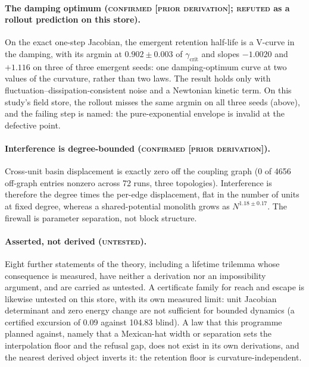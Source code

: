 \documentclass{article} %
\begin{document}
\paragraph{The damping optimum (\textsc{confirmed [prior derivation]}; \textsc{refuted} as a
rollout prediction on this store).} On the exact one-step Jacobian, the emergent retention
half-life is a V-curve in the damping, with its argmin at $0.902\pm0.003$ of
$\gamma_{\text{crit}}$ and slopes $-1.0020$ and $+1.116$ on three of three emergent seeds: one
damping-optimum curve at two values of the curvature, rather than two laws.
The result holds only with fluctuation--dissipation-consistent noise and a Newtonian kinetic term.
On this study's field store, the rollout misses the same argmin on all three seeds (above), and the
failing step is named: the pure-exponential envelope is invalid at the defective point.

\paragraph{Interference is degree-bounded (\textsc{confirmed [prior derivation]}).} Cross-unit
basin displacement is exactly zero off the coupling graph (0 of 4656 off-graph entries nonzero
across 72 runs, three topologies). Interference is therefore the degree times the per-edge
displacement, flat in the number of units at fixed degree, whereas a shared-potential monolith
grows as $N^{1.18\pm0.17}$. The firewall is parameter separation, not block structure.

\paragraph{Asserted, not derived (\textsc{untested}).} Eight further statements of the theory,
including a lifetime trilemma whose consequence is measured, have neither a derivation nor an
impossibility argument, and are carried as untested. A certificate family for reach and escape is
likewise untested on this store, with its own measured limit: unit Jacobian determinant and zero
energy change are not sufficient for bounded dynamics (a certified excursion of 0.09 against
104.83 blind). %
A law that this programme planned against, namely that a Mexican-hat width or separation sets
the interpolation floor and the refusal gap, does not exist in its own derivations, and the
nearest derived object inverts it: the retention floor is curvature-independent. %
\end{document}
